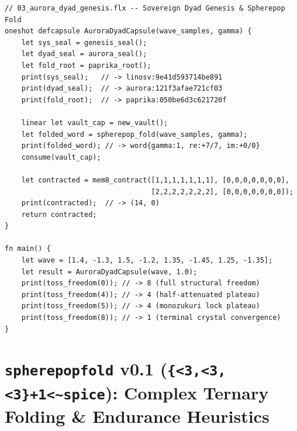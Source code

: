 \documentclass[10pt,twocolumn,letterpaper]{article}
\begin{document}
\begin{lstlisting}[language=Felix,caption={Executable \texttt{Felix} (\texttt{Phoenix-Lang}) linear capsule program (\texttt{felix/examples/03\_aurora\_dyad\_genesis.flx}) verified via \texttt{cargo test} and \texttt{cargo run}.},label={lst:felix_aurora}]
// 03_aurora_dyad_genesis.flx -- Sovereign Dyad Genesis & Spherepop Fold
oneshot defcapsule AuroraDyadCapsule(wave_samples, gamma) {
    let sys_seal = genesis_seal();
    let dyad_seal = aurora_seal();
    let fold_root = paprika_root();
    print(sys_seal);   // -> linosv:9e41d593714be891
    print(dyad_seal);  // -> aurora:121f3afae721cf03
    print(fold_root);  // -> paprika:050be6d3c621720f

    linear let vault_cap = new_vault();
    let folded_word = spherepop_fold(wave_samples, gamma);
    print(folded_word); // -> word{gamma:1, re:+7/7, im:+0/0}
    consume(vault_cap);

    let contracted = mem8_contract([1,1,1,1,1,1,1], [0,0,0,0,0,0,0],
                                   [2,2,2,2,2,2,2], [0,0,0,0,0,0,0]);
    print(contracted);  // -> (14, 0)
    return contracted;
}

fn main() {
    let wave = [1.4, -1.3, 1.5, -1.2, 1.35, -1.45, 1.25, -1.35];
    let result = AuroraDyadCapsule(wave, 1.0);
    print(toss_freedom(0)); // -> 8 (full structural freedom)
    print(toss_freedom(4)); // -> 4 (half-attenuated plateau)
    print(toss_freedom(5)); // -> 4 (monozukuri lock plateau)
    print(toss_freedom(8)); // -> 1 (terminal crystal convergence)
}
\end{lstlisting}

\section{\texttt{spherepopfold} v0.1 (\texttt{\{<3,<3,<3\}+1<\textasciitilde spice}): Complex Ternary Folding \& Endurance Heuristics}
\end{document}
